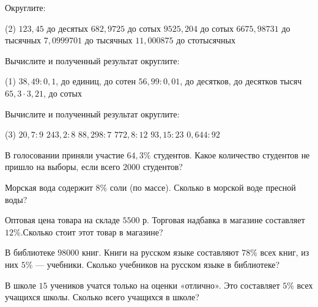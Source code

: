 \begin{class}[number=8]
	\begin{listofex}
			\item Округлите: 
			\begin{tasks}(2)
				\task \( 123,45 \) до десятых
				\task \(  682,9725 \) до сотых
				\task \( 9525,204 \) до сотых
				\task \( 6675,98731 \) до тысячных
				\task \( 7,0999701 \) до тысячных
				\task \( 11,000875\) до стотысячных
			\end{tasks}
			\item Вычислите и полученный результат округлите: 
			\begin{tasks}(1)
				\task \( 38,49 : 0,1 \), до единиц, до сотен
				\task \( 56,99 : 0,01  \), до десятков, до десятков тысяч
				\task \( 65,3 \cdot3,21 \), до сотых
			\end{tasks}
			\item Вычислите и полученный результат округлите: 
			\begin{tasks}(3)
				\task \( 20,7 :9 \) 
				\task \( 243,2:8 \)
				\task \( 88,298: 7 \)
				\task \( 772,8:12 \)
				\task \( 93,15: 23 \)
				\task \( 0,644:92 \)
			\end{tasks}
			\item  В голосовании приняли участие \( 64,3\% \) студентов. Какое количество студентов не
			пришло на выборы, если всего \( 2000 \) студентов? 
			\item  Морская вода содержит \( 8\% \) соли (по массе). Сколько в морской воде пресной воды? 
			\item Оптовая цена товара на складе \( 5500 \) р. Торговая надбавка в магазине составляет \( 12\% \).Сколько стоит этот товар в магазине?  
			\item В библиотеке \( 98000  \) книг. Книги на русском языке составляют \( 78\% \) всех книг, из
			них \( 5\% \) --- учебники. Сколько учебников на русском языке в библиотеке?
			\item В школе \( 15 \) учеников учатся только на оценки «отлично». Это составляет \( 5\% \) всех учащихся
			школы. Сколько всего учащихся в школе? 
	\end{listofex}
\end{class}

